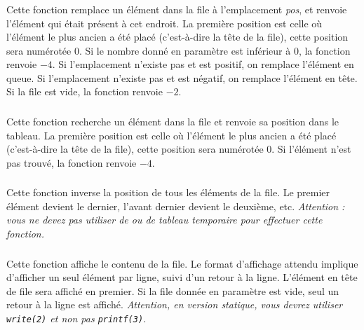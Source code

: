 \subsubsection*{}

\noindent Cette fonction remplace un élément dans la file à l'emplacement \textit{pos}, et renvoie l'élément qui était présent à cet endroit.
La première position est celle où l'élément le plus ancien a été placé (c'est-à-dire la tête de la file), cette position sera numérotée $ 0 $.
Si le nombre donné en paramètre est inférieur à $ 0 $, la fonction renvoie $ -4 $.
Si l'emplacement n'existe pas et est positif, on remplace l'élément en queue.
Si l'emplacement n'existe pas et est négatif, on remplace l'élément en tête.
Si la file est vide, la fonction renvoie $ -2 $.


\subsubsection*{}

\noindent Cette fonction recherche un élément dans la file et renvoie sa position dans le tableau.
La première position est celle où l'élément le plus ancien a été placé (c'est-à-dire la tête de la file), cette position sera numérotée $ 0 $.
Si l'élément n'est pas trouvé, la fonction renvoie $ -4 $.


\subsubsection*{}

\noindent Cette fonction inverse la position de tous les éléments de la file.
Le premier élément devient le dernier, l'avant dernier devient le deuxième, etc.
\textit{Attention : vous ne devez pas utiliser de  ou de tableau temporaire pour effectuer cette fonction.}

\subsubsection*{}

\noindent Cette fonction affiche le contenu de la file.
Le format d'affichage attendu implique d'afficher un seul élément par ligne, suivi d'un retour à la ligne.
L'élément en tête de file sera affiché en premier.
Si la file donnée en paramètre est vide, seul un retour à la ligne est affiché.
\textit{Attention, en version statique, vous devrez utiliser \texttt{write(2)} et non pas \texttt{printf(3)}.}

